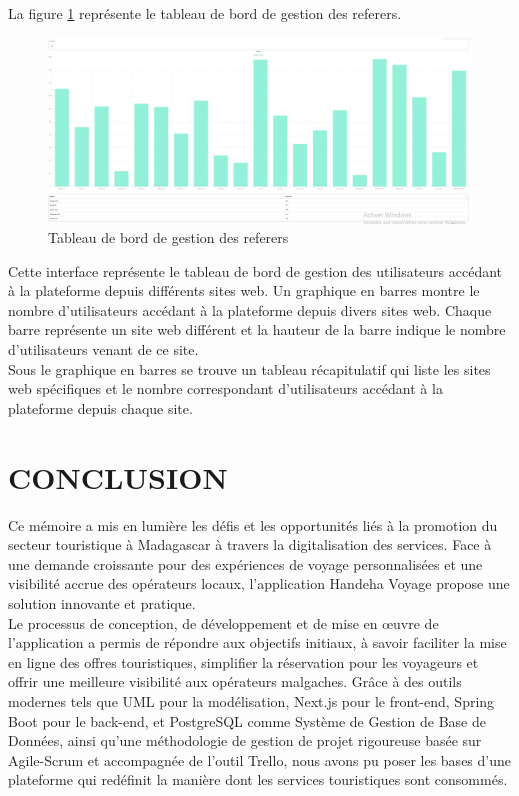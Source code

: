 \documentclass[12pt]{report}
\begin{document}
			La figure \ref{fig:referer} représente le tableau de bord de gestion des referers.

			\begin{figure}[h]
				\centering
				\includegraphics[width=\textwidth]{referer.jpg}
				\caption{Tableau de bord de gestion des referers}
				\label{fig:referer}
			\end{figure}
			\FloatBarrier
			
	
			Cette interface représente le tableau de bord de gestion des utilisateurs accédant à la plateforme depuis différents sites web. Un graphique en barres montre le nombre d'utilisateurs accédant à la plateforme depuis divers sites web. Chaque barre représente un site web différent et la hauteur de la barre indique le nombre d'utilisateurs venant de ce site.\\

			Sous le graphique en barres se trouve un tableau récapitulatif qui liste les sites web spécifiques et le nombre correspondant d'utilisateurs accédant à la plateforme depuis chaque site.


			\chapter*{CONCLUSION}

			\hspace{15pt} Ce mémoire a mis en lumière les défis et les opportunités liés à la promotion du secteur touristique à Madagascar à travers la digitalisation des services. Face à une demande croissante pour des expériences de voyage personnalisées et une visibilité accrue des opérateurs locaux, l'application Handeha Voyage propose une solution innovante et pratique.\\

			Le processus de conception, de développement et de mise en œuvre de l’application a permis de répondre aux objectifs initiaux, à savoir faciliter la mise en ligne des offres touristiques, simplifier la réservation pour les voyageurs et offrir une meilleure visibilité aux opérateurs malgaches. Grâce à des outils modernes tels que UML pour la modélisation, Next.js pour le front-end, Spring Boot pour le back-end, et PostgreSQL comme Système de Gestion de Base de Données, ainsi qu’une méthodologie de gestion de projet rigoureuse basée sur Agile-Scrum et accompagnée de l’outil Trello, nous avons pu poser les bases d’une plateforme qui redéfinit la manière dont les services touristiques sont consommés.\\
\end{document}
